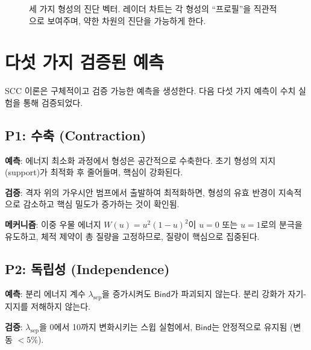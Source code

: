 \begin{figure}[t]
\centering
{}
\caption{세 가지 형성의 진단 벡터. 레이더 차트는 각 형성의 ``프로필''을 직관적으로 보여주며, 약한 차원의 진단을 가능하게 한다.}
\label{fig:diagnostic-examples}
\end{figure}


\section{다섯 가지 검증된 예측}
\label{sec:five-predictions}

SCC 이론은 구체적이고 검증 가능한 예측을 생성한다. 다음 다섯 가지 예측이 수치 실험을 통해 검증되었다.

\subsection{P1: 수축 (Contraction)}

\textbf{예측}: 에너지 최소화 과정에서 형성은 공간적으로 수축한다. 초기 형성의 지지(support)가 최적화 후 줄어들며, 핵심이 강화된다.

\textbf{검증}: 격자 위의 가우시안 범프에서 출발하여 최적화하면, 형성의 유효 반경이 지속적으로 감소하고 핵심 밀도가 증가하는 것이 확인됨.

\textbf{메커니즘}: 이중 우물 에너지 $W(u) = u^2(1-u)^2$이 $u = 0$ 또는 $u = 1$로의 분극을 유도하고, 체적 제약이 총 질량을 고정하므로, 질량이 핵심으로 집중된다.

\subsection{P2: 독립성 (Independence)}

\textbf{예측}: 분리 에너지 계수 $\lambda_{\mathrm{sep}}$을 증가시켜도 $\mathsf{Bind}$가 파괴되지 않는다. 분리 강화가 자기-지지를 저해하지 않는다.

\textbf{검증}: $\lambda_{\mathrm{sep}}$을 0에서 10까지 변화시키는 스윕 실험에서, $\mathsf{Bind}$는 안정적으로 유지됨 (변동 $< 5\%$).

